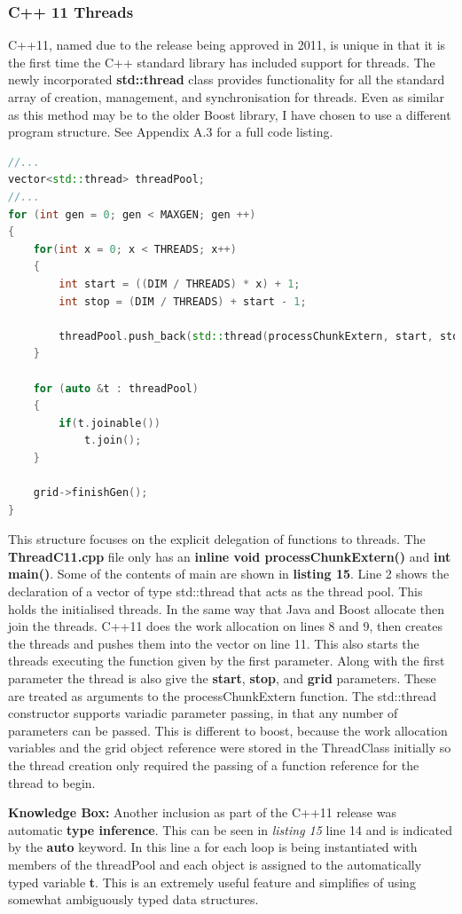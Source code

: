 \documentclass[11pt]{article} %
\begin{document}
\subsubsection{C++ 11 Threads}
C++11, named due to the release being approved in 2011, is unique in that it is the first time the C++ standard library has included support for threads. The newly incorporated {\bf std::thread} class provides functionality for all the standard array of creation, management, and synchronisation for threads. Even as similar as this method may be to the older Boost library, I have chosen to use a different program structure. See Appendix A.3 for a full code listing.
\begin{lstlisting}[language=c++, caption={Main game loop from C++ 11 implementation}]
//...    
vector<std::thread> threadPool;
//...
for (int gen = 0; gen < MAXGEN; gen ++)
{
    for(int x = 0; x < THREADS; x++)
    {
        int start = ((DIM / THREADS) * x) + 1;
        int stop = (DIM / THREADS) + start - 1;

        threadPool.push_back(std::thread(processChunkExtern, start, stop, grid));
    }
    
    for (auto &t : threadPool)
    {
        if(t.joinable())
            t.join();
    }
    
    grid->finishGen();
}
\end{lstlisting}
This structure focuses on the explicit delegation of functions to threads. The {\bf ThreadC11.cpp} file only has an {\bf inline void processChunkExtern()} and {\bf int main()}. Some of the contents of main are shown in {\bf listing 15}. Line 2 shows the declaration of a vector of type std::thread that acts as the thread pool. This holds the initialised threads. In the same way that Java and Boost allocate then join the threads. C++11 does the work allocation on lines 8 and 9, then creates the threads and pushes them into the vector on line 11. This also starts the threads executing the function given by the first parameter. Along with the first parameter the thread is also give the {\bf start}, {\bf stop}, and {\bf grid} parameters. These are treated as arguments to the processChunkExtern function. The std::thread constructor supports variadic parameter passing, in that any number of parameters can be passed. This is different to boost, because the work allocation variables and the grid object reference were stored in the ThreadClass initially so the thread creation only required the passing of a function reference for the thread to begin.
\bigskip
\begin{mdframed}
{\bf Knowledge Box:} Another inclusion as part of the C++11 release was automatic {\bf type inference}. This can be seen in {\it listing 15} line 14 and is indicated by the {\bf auto} keyword. In this line a for each loop is being instantiated with members of the threadPool and each object is assigned to the automatically typed variable {\bf t}. This is an extremely useful feature and simplifies of using somewhat ambiguously typed data structures.
\end{mdframed}
\end{document}
